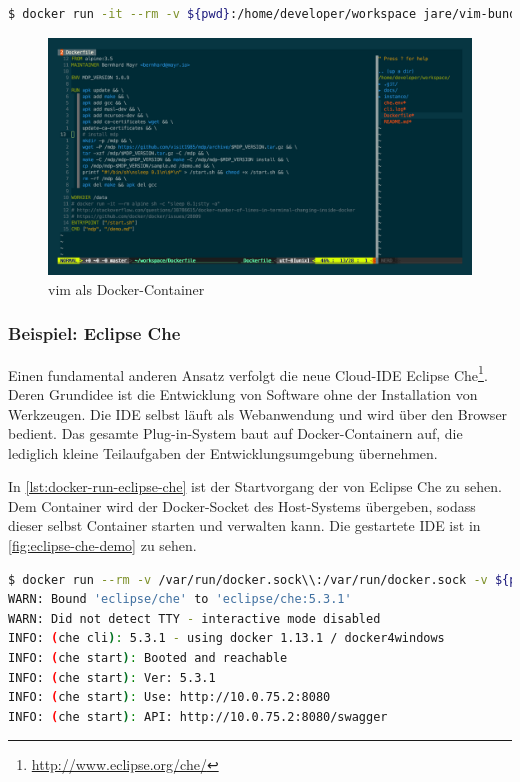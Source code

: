 \begin{lstlisting}[caption=Docker-Kommando zum Starten von vim, language=bash, label=lst:docker-run-vim]
$ docker run -it --rm -v ${pwd}:/home/developer/workspace jare/vim-bundle
\end{lstlisting}

\begin{figure}[htbp]
    \centering
    \includegraphics[width=0.9\linewidth,clip]{images/vim-demo}
    \caption{vim als Docker-Container}
\label{fig:vim-demo}
\end{figure}

\subsubsection{Beispiel: Eclipse Che}
Einen fundamental anderen Ansatz verfolgt die neue Cloud-IDE Eclipse Che\footnote{\url{http://www.eclipse.org/che/}}.
Deren Grundidee ist die Entwicklung von Software ohne der Installation von Werkzeugen.
Die IDE selbst läuft als Webanwendung und wird über den Browser bedient.
Das gesamte Plug-in-System baut auf Docker-Containern auf, die lediglich kleine Teilaufgaben der Entwicklungsumgebung übernehmen.

In \cref{lst:docker-run-eclipse-che} ist der Startvorgang der von Eclipse Che zu sehen.
Dem Container wird der Docker-Socket des Host-Systems übergeben, sodass dieser selbst Container starten und verwalten kann.
Die gestartete IDE ist in \cref{fig:eclipse-che-demo} zu sehen.

\begin{lstlisting}[caption=Docker-Kommando zum Starten von Eclipse Che, language=bash, label=lst:docker-run-eclipse-che]
$ docker run --rm -v /var/run/docker.sock\\:/var/run/docker.sock -v ${pwd}:/data eclipse/che start
WARN: Bound 'eclipse/che' to 'eclipse/che:5.3.1'
WARN: Did not detect TTY - interactive mode disabled
INFO: (che cli): 5.3.1 - using docker 1.13.1 / docker4windows
INFO: (che start): Booted and reachable
INFO: (che start): Ver: 5.3.1
INFO: (che start): Use: http://10.0.75.2:8080
INFO: (che start): API: http://10.0.75.2:8080/swagger
\end{lstlisting}

